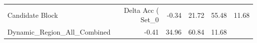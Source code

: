 \begin{tabular}{lrrrr}
\toprule
Candidate Block & Delta Acc (%
\midrule
Set_0 & -0.34 & 21.72 & 55.48 & 11.68 \\
Dynamic_Region_All_Combined & -0.41 & 34.96 & 60.84 & 11.68 \\
\bottomrule
\end{tabular}
